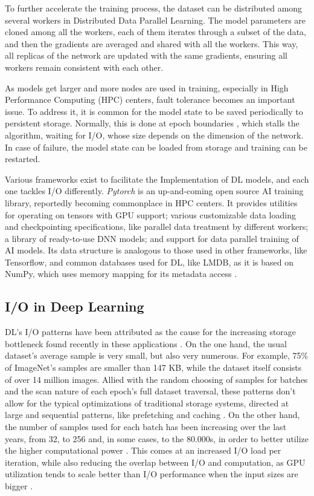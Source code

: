 \documentclass[conference]{IEEEtran}
\begin{document}
To further accelerate the training process, the dataset can be distributed among several workers in Distributed Data Parallel Learning. The model parameters are cloned among all the workers, each of them iterates through a subset of the data, and then the gradients are averaged and shared with all the workers. This way, all replicas of the network are updated with the same gradients, ensuring all workers remain consistent with each other.

As models get larger and more nodes are used in training, especially in High Performance Computing (HPC) centers, fault tolerance becomes an important issue. To address it, it is common for the model state to be saved periodically to persistent storage. Normally, this is done at epoch boundaries \cite{checkfreq}, which stalls the algorithm, waiting for I/O, whose size depends on the dimension of the network. In case of failure, the model state can be loaded from storage and training can be restarted.

Various frameworks exist to facilitate the Implementation of DL models, and each one tackles I/O differently. \textit{Pytorch} \cite{pytorch} is an up-and-coming open source AI training library, reportedly becoming commonplace in HPC centers. It provides utilities for operating on tensors with GPU support; various customizable data loading and checkpointing specifications, like parallel data treatment by different workers; a library of ready-to-use DNN models; and support for data parallel training of AI models. Its data structure is analogous to those used in other frameworks, like Tensorflow, and common databases used for DL, like LMDB, as it is based on NumPy, which uses memory mapping for its metadata access \cite{LMDB}.

\subsection{I/O in Deep Learning}

DL's I/O patterns have been attributed as the cause for the increasing storage bottleneck found recently in these applications \cite{beegfs}. On the one hand, the usual dataset's average sample is very small, but also very numerous. For example, 75\% of ImageNet's samples are smaller than 147 KB, while the dataset itself consists of over 14 million images. Allied with the random choosing of samples for batches and the scan nature of each epoch's full dataset traversal, these patterns don't allow for the typical optimizations of traditional storage systems, directed at large and sequential patterns, like prefetching and caching \cite{initial}. On the other hand, the number of samples used for each batch has been increasing over the last years, from 32, to 256 and, in some cases, to the 80.000s, in order to better utilize the higher computational power \cite{nvme}. This comes at an increased I/O load per iteration, while also reducing the overlap between I/O and computation, as GPU utilization tends to scale better than I/O performance when the input sizes are bigger \cite{TFbenchmark}.
\end{document}

